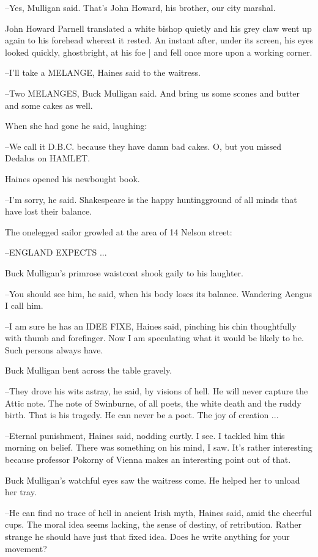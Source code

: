 --Yes,
Mulligan said.
That's John Howard, his brother, our city marshal.

John Howard Parnell translated a white bishop quietly
and his grey claw went up again to his forehead
whereat it rested.
An instant after,
under its screen,
his eyes looked quickly, ghostbright, at his foe |
and fell once more upon a working corner.

--I'll take a MELANGE,
Haines said to the waitress.

--Two MELANGES,
Buck Mulligan said.
And bring us some scones and butter
and some cakes as well.

When she had gone
he said, laughing:

--We call it D.B.C. because they have damn bad cakes.
O, but you missed
Dedalus on HAMLET.

Haines opened his newbought book.%

--I'm sorry,
he said.
Shakespeare is the happy huntingground of all minds
that have lost their balance.

The onelegged sailor growled at the area of 14 Nelson street:

--ENGLAND EXPECTS ...

Buck Mulligan's primrose waistcoat shook gaily to his laughter.

--You should see him,
he said,
when his body loses its balance.
Wandering
Aengus I call him.

--I am sure he has an IDEE FIXE,
Haines said,
pinching his chin thoughtfully with thumb and forefinger.
Now I am speculating what it would be likely to be.
Such persons always have.

Buck Mulligan bent across the table gravely.

--They drove his wits astray,
he said,
by visions of hell.
He will never
capture the Attic note.
The note of Swinburne,
of all poets,
the white
death and the ruddy birth.
That is his tragedy.
He can never be a poet.
The joy of creation ...

--Eternal punishment,
Haines said,
nodding curtly.
I see.
I tackled him
this morning on belief.
There was something on his mind, I saw.
It's
rather interesting
because professor Pokorny of Vienna makes an
interesting point out of that.

Buck Mulligan's watchful eyes saw the waitress come.
He helped her to unload her tray.

--He can find no trace of hell in ancient Irish myth,
Haines said,
amid
the cheerful cups.
The moral idea seems lacking,
the sense of destiny, of
retribution.
Rather strange he should have just that fixed idea.
Does he
write anything for your movement?

